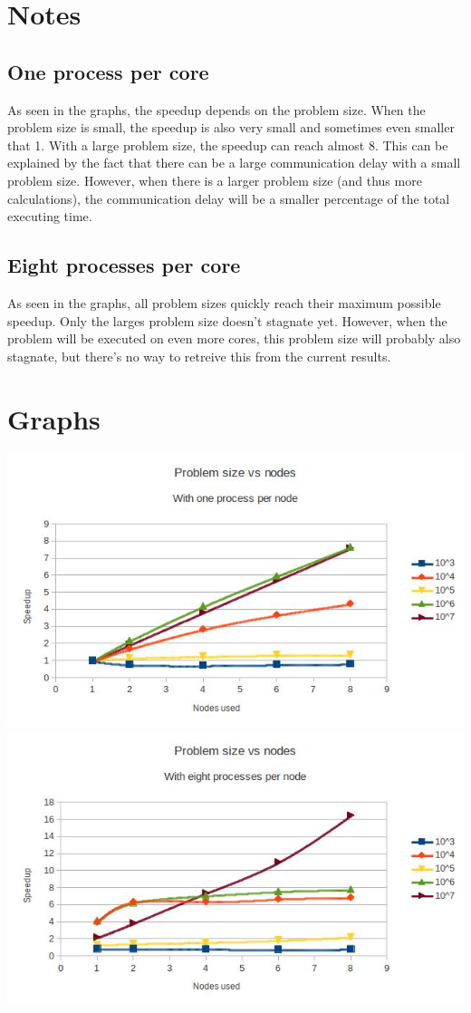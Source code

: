 \documentclass[12pt]{article}
\begin{document}
\maketitle
\section{Notes}
\subsection{One process per core}
As seen in the graphs, the speedup depends on the problem size. When the problem size is small, the speedup is also very small and sometimes even smaller that 1. With a large problem size, the speedup can reach almost 8. This can be explained by the fact that there can be a large communication delay with a small problem size. However, when there is a larger problem size (and thus more calculations), the communication delay will be a smaller percentage of the total executing time.
\subsection{Eight processes per core}
As seen in the graphs, all problem sizes quickly reach their maximum possible speedup. Only the larges problem size doesn't stagnate yet. However, when the problem will be executed on even more cores, this problem size will probably also stagnate, but there's no way to retreive this from the current results.
\clearpage
\section{Graphs}
\includegraphics[width=\textwidth]{oneproc.jpg}
\includegraphics[width=\textwidth]{eightproc.jpg}
\end{document}

